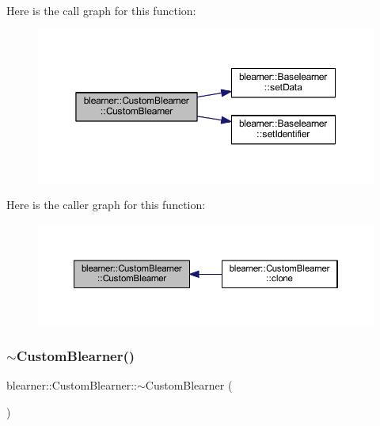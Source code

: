 Here is the call graph for this function\+:\nopagebreak
\begin{figure}[H]
\begin{center}
\leavevmode
\includegraphics[width=350pt]{classblearner_1_1_custom_blearner_a99b05f69e8d3cacfab556b6a5310f50a_cgraph}
\end{center}
\end{figure}
Here is the caller graph for this function\+:\nopagebreak
\begin{figure}[H]
\begin{center}
\leavevmode
\includegraphics[width=350pt]{classblearner_1_1_custom_blearner_a99b05f69e8d3cacfab556b6a5310f50a_icgraph}
\end{center}
\end{figure}
\mbox{\label{classblearner_1_1_custom_blearner_ada8c7351aa50e8149dfd546840c51f51}} 
\subsubsection{\texorpdfstring{$\sim$\+Custom\+Blearner()}{~CustomBlearner()}}
{\footnotesize\ttfamily blearner\+::\+Custom\+Blearner\+::$\sim$\+Custom\+Blearner (\begin{DoxyParamCaption}{ }\end{DoxyParamCaption})}



